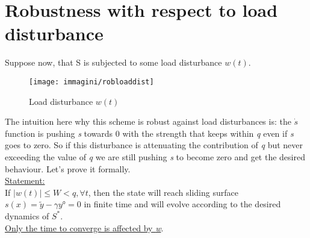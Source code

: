 \section{Robustness with respect to load disturbance}
Suppose now, that S is subjected to some load disturbance $w(t)$.
\begin{figure}[H]
	\centering
	\texttt{[image: immagini/robloaddist]}
	\caption{Load disturbance $w(t)$}
	\label{fig:robloaddist}
\end{figure}
The intuition here why this scheme is robust against load disturbances is: the $\dot{s}$ function is pushing \emph{s} towards 0 with the strength that keeps within \emph{q} even if \emph{s} goes to zero. So if this disturbance is attenuating the contribution of \emph{q} but never exceeding the value of \emph{q} we are  still pushing \emph{s} to become zero and get the desired behaviour. Let's prove it formally.\\
\underline{Statement:}\\
If $|w(t)|\le W<q, \forall t$, then the state will reach sliding surface $s(x)=\tilde{y}-\gamma y°=0$ in finite time and will evolve according to the desired dynamics of $S^*$. \\\underline{Only the time to converge is affected by \emph{w}}.
